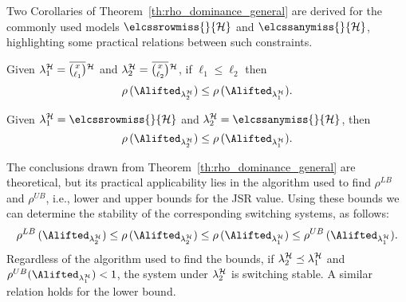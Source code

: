 Two Corollaries of Theorem~\ref{th:rho_dominance_general} are derived for the commonly used models $\elcssrowmiss{}{\strat}$ and $\elcssanymiss{}{\strat}$, highlighting some practical relations between such constraints.
\begin{corollary}%
    \label{cor:rho_dominance_mk}%
    Given $\lambda^\strat_1 = \overbar{\binom{x}{\ell_1}}^{\strat}$ and $\lambda^\strat_2 = \overbar{\binom{x}{\ell_2}}^{\strat}$, if $\ell_1 \leq \ell_2$ then
    $$
        \rho\,(\Alifted_{\lambda^\strat_2}) \leq \rho\,(\Alifted_{\lambda^\strat_1}).
    $$
\end{corollary}
\begin{corollary}%
    \label{cor:rho_dominance_cons}%
    Given $\lambda^\strat_1 = \elcssrowmiss{}{\strat}$ and $\lambda^\strat_2 = \elcssanymiss{}{\strat}$, then
    $$
        \rho\,(\Alifted_{\lambda^\strat_2}) \leq \rho\,(\Alifted_{\lambda^\strat_1}).
    $$
\end{corollary}
%
The conclusions drawn from Theorem~\ref{th:rho_dominance_general} are theoretical, but its practical applicability lies in the algorithm used to find $\rho^{LB}$ and $\rho^{UB}$, i.e., lower and upper bounds for the JSR value.
Using these bounds we can determine the stability of the corresponding switching systems, as follows:
%
$$
\rho^{LB} \,( \Alifted_{\lambda^\strat_2} ) \leq \rho \,( \Alifted_{\lambda^\strat_2} ) \leq \rho \,( \Alifted_{\lambda^\strat_1} ) \leq \rho^{UB} \,( \Alifted_{\lambda^\strat_1} ).
$$
%
Regardless of the algorithm used to find the bounds, if $\lambda^{\mathcal{H}}_2 \preceq \lambda^{\mathcal{H}}_1$ and $\rho^{UB} ( \Alifted_{\lambda^\strat_1} ) < 1$, the system under $\lambda^{\mathcal{H}}_2$ is switching stable.
A similar relation holds for the lower bound.


